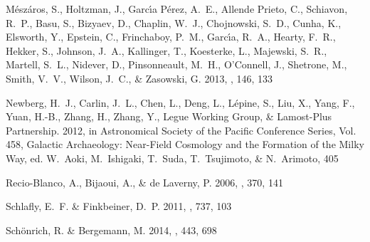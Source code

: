 \documentclass[12pt, preprint]{aastex}
\begin{document}
\begin{thebibliography}{23}
{M{\'e}sz{\'a}ros}, S., {Holtzman}, J., {Garc{\'{\i}}a P{\'e}rez}, A.~E.,
  {Allende Prieto}, C., {Schiavon}, R.~P., {Basu}, S., {Bizyaev}, D.,
  {Chaplin}, W.~J., {Chojnowski}, S.~D., {Cunha}, K., {Elsworth}, Y.,
  {Epstein}, C., {Frinchaboy}, P.~M., {Garc{\'{\i}}a}, R.~A., {Hearty}, F.~R.,
  {Hekker}, S., {Johnson}, J.~A., {Kallinger}, T., {Koesterke}, L., {Majewski},
  S.~R., {Martell}, S.~L., {Nidever}, D., {Pinsonneault}, M.~H., {O'Connell},
  J., {Shetrone}, M., {Smith}, V.~V., {Wilson}, J.~C., \& {Zasowski}, G. 2013,
  \aj, 146, 133

{Newberg}, H.~J., {Carlin}, J.~L., {Chen}, L., {Deng}, L., {L{\'e}pine}, S.,
  {Liu}, X., {Yang}, F., {Yuan}, H.-B., {Zhang}, H., {Zhang}, Y., {Legue
  Working Group}, \& {Lamost-Plus Partnership}. 2012, in Astronomical Society
  of the Pacific Conference Series, Vol. 458, Galactic Archaeology: Near-Field
  Cosmology and the Formation of the Milky Way, ed. W.~{Aoki}, M.~{Ishigaki},
  T.~{Suda}, T.~{Tsujimoto}, \& N.~{Arimoto}, 405

{Recio-Blanco}, A., {Bijaoui}, A., \& {de Laverny}, P. 2006, \mnras, 370, 141

{Schlafly}, E.~F. \& {Finkbeiner}, D.~P. 2011, \apj, 737, 103

{Sch{\"o}nrich}, R. \& {Bergemann}, M. 2014, \mnras, 443, 698


\end{thebibliography}
\end{document}

